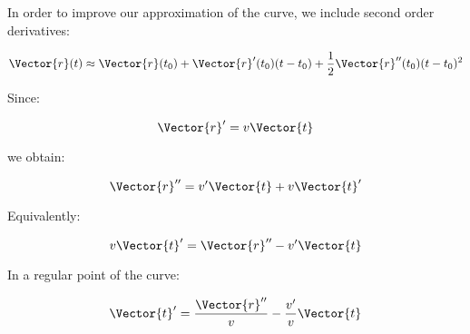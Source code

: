  In order to improve our approximation of the curve, we include second order derivatives:
 
 \[
  \label{eq:taylor:1}
  \Vector{r}(t)
  \approx
  \Vector{r}(t_0)
  +
  \Vector{r}'(t_0)(t-t_0)
  +
  \frac{1}{2}
  \Vector{r}''(t_0)(t-t_0)^2
\]

Since:

\[
 \Vector{r}'
 =
 v \Vector{t}
\]

we obtain:

\[
 \Vector{r}''
 =
 v' \Vector{t}
 +
 v \Vector{t}'
\]

Equivalently:

\[
 v \Vector{t}'
 =
 \Vector{r}''
 -
 v' \Vector{t}
\]

In a regular point of the curve:

\[
 \Vector{t}'
 =
 \frac{ \Vector{r}'' }{ v}
 -
 \frac{v'}{v} \Vector{t}
\]

